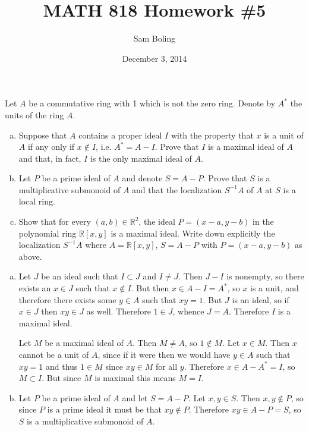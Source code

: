 \documentclass{article}
\title{MATH 818 Homework \#5}
\date{December 3, 2014}
\author{Sam Boling}
\newcounter{Problem}
\newenvironment{Problem}{\begin{Exercise}[name={Problem},
                                          counter={Problem}]}
                        {\end{Exercise}}
\begin{document}
\begin{titlepage}
\maketitle
\end{titlepage}

\begin{Problem}
  Let $A$ be a commutative ring with 1 which is not the zero
  ring. Denote by $A^\ast$ the units of the ring $A$.
  \begin{enumerate}[(a)]
    \item{
      Suppose that $A$ contains a proper ideal $I$ with the property
      that $x$ is a unit of $A$ if any only if $x \notin I$, i.e.
      $A^\ast = A - I$. Prove that $I$ is a maximal ideal of $A$ and
      that, in fact, $I$ is the only maximal ideal of $A$.
    }
    \item{
      Let $P$ be a prime ideal of $A$ and denote $S = A - P$. Prove
      that $S$ is a multiplicative submonoid of $A$ and that the
      localization $S^{-1}A$ of $A$ at $S$ is a local ring.
    }
    \item{
      Show that for every $(a, b) \in \mathbb{R}^2$, the ideal
      $P = (x - a, y - b)$ in the polynomial ring
      $\mathbb{R}[x, y]$ is a maximal ideal. Write down explicitly the
      localization $S^{-1} A$ where $A = \mathbb{R}[x, y]$,
      $S = A - P$ with $P = (x - a, y - b)$ as above.
    }
  \end{enumerate}
\end{Problem}

\begin{Answer}
  \begin{enumerate}[(a)]
    \item{
      Let $J$ be an ideal such that $I \subset J$ and
      $I \neq J$. Then $J - I$ is nonempty, so there exists an
      $x \in J$ such that $x \notin I$. But then
      $x \in A - I = A^\ast$, so $x$ is a unit, and therefore there
      exists some $y \in A$ such that $xy = 1$. But $J$ is an ideal,
      so if $x \in J$ then $xy \in J$ as well. Therefore $1 \in J$,
      whence $J = A$. Therefore $I$ is a maximal ideal.

      Let $M$ be a maximal ideal of $A$. Then $M \neq A$, so
      $1 \notin M$. Let $x \in M$. Then $x$ cannot be a unit of $A$,
      since if it were then we would have $y \in A$ such that $xy = 1$
      and thus $1 \in M$ since $xy \in M$ for all $y$. Therefore
      $x \in A - A^\ast = I$, so $M \subset I$. But since $M$ is
      maximal this means $M = I$.
    }
    \item{
      Let $P$ be a prime ideal of $A$ and let $S = A - P$. Let
      $x, y \in S$. Then $x, y \notin P$, so since $P$ is a prime
      ideal it must be that $xy \notin P$. Therefore $xy \in A - P =
      S$,
      so $S$ is a multiplicative submonoid of $A$.


    }
  \end{enumerate}
\end{Answer}
\end{document}
